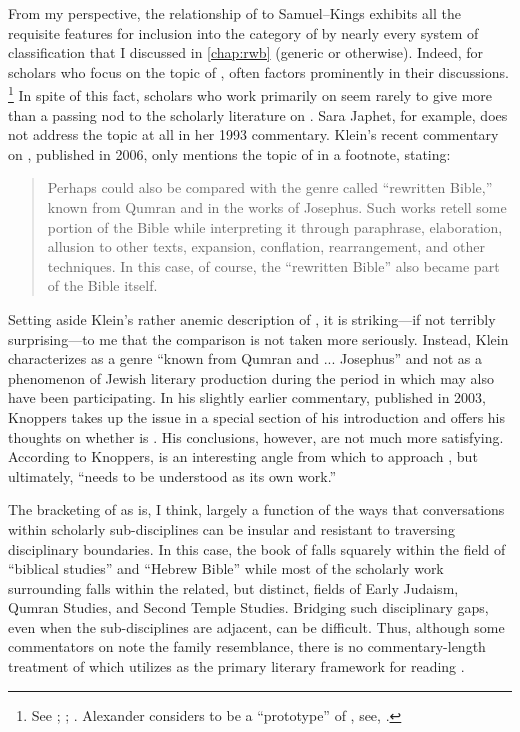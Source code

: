 From my perspective, the relationship of \chronicles to Samuel--Kings exhibits all the requisite features for inclusion into the category of \rwb by nearly every system of classification that I discussed in \autoref{chap:rwb} (generic or otherwise). Indeed, for scholars who focus on the topic of \rwb, \chronicles often factors prominently in their discussions.%
    \footnote{See
        \cite{campbell_zsengeller2014};
        \cite{zahn_lim-collins2010};
        \cite{bernstein_textus2005}.
        Alexander considers \chronicles to be a ``prototype'' of \rwb, see,
        \cite[100]{alexander_carson-williamson1988}.}
In spite of this fact, scholars who work primarily on \chronicles seem rarely to give more than a passing nod to the scholarly literature on \rwb. Sara Japhet, for example, does not address the topic at all in her 1993 commentary.%
    \autocite{japhet1993}
Klein's recent commentary on \chronicles, published in 2006, only mentions the topic of \rwb in a footnote, stating:
\begin{quote}
    Perhaps \chronicles could also be compared with the genre called ``rewritten Bible,'' known from Qumran and in the works of Josephus. Such works retell some portion of the Bible while interpreting it through paraphrase, elaboration, allusion to other texts, expansion, conflation, rearrangement, and other techniques. In this case, of course, the ``rewritten Bible'' also became part of the Bible itself.%
    \autocite[17 n.157]{klein2006}
\end{quote}
\noindent
Setting aside Klein's rather anemic description of \rwb, it is striking---if not terribly surprising---to me that the comparison is not taken more seriously. Instead, Klein characterizes \rwb as a genre ``known from Qumran and ... Josephus'' and not as a phenomenon of Jewish literary production during the \secondtemple period in which \chronicles may also have been participating. In his slightly earlier commentary, published in 2003, Knoppers takes up the issue in a special section of his introduction and offers his thoughts on whether \chronicles is \rwb.%
    \autocite[129--134]{knoppers2003}
His conclusions, however, are not much more satisfying. According to Knoppers, \rwb is an interesting angle from which to approach \chronicles, but ultimately, ``\chronicles needs to be understood as its own work.''%
    \autocite[134]{knoppers2003}

The bracketing of \chronicles as \rwb is, I think, largely a function of the ways that conversations within scholarly sub-disciplines can be insular and resistant to traversing disciplinary boundaries. In this case, the book of \chronicles falls squarely within the field of ``biblical studies'' and ``Hebrew Bible'' while most of the scholarly work surrounding \rwb falls within the related, but distinct, fields of Early Judaism, Qumran Studies, and Second Temple Studies. Bridging such disciplinary gaps, even when the sub-disciplines are adjacent, can be difficult. Thus, although some commentators on \chronicles note the family resemblance, there is no commentary-length treatment of \chronicles which utilizes \rwb as the primary literary framework for reading \chronicles.

